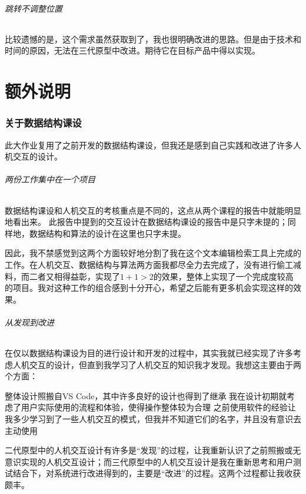 \documentclass[scheme = chinese]{ctexart}
\begin{document}
\paragraph{跳转不调整位置}
比较遗憾的是，这个需求虽然获取到了，我也很明确改进的思路。但是由于技术和时间的原因，无法在三代原型中改进。期待它在目标产品中得以实现。

\clearpage

\part{额外说明}

\section{关于数据结构课设}
此大作业复用了之前开发的数据结构课设，但我还是感到自己实践和改进了许多人机交互的设计。

\paragraph{两份工作集中在一个项目}
数据结构课设和人机交互的考核重点是不同的，这点从两个课程的报告中就能明显地看出来。
此报告中提到的交互设计在数据结构课设的报告中是只字未提的；同样地，数据结构和算法的设计在这里也只字未提。

因此，我不禁感觉到这两个方面较好地分割了我在这个文本编辑检索工具上完成的工作。在人机交互、数据结构与算法两方面我都尽全力去完成了，没有进行偷工减料，而二者又相得益彰，实现了$1+1>2$的效果，整体上实现了一个完成度较高的项目。我对这种工作的组合感到十分开心，希望之后能有更多机会实现这样的效果。

\paragraph{从发现到改进}
在仅以数据结构课设为目的进行设计和开发的过程中，其实我就已经实现了许多考虑人机交互的设计，但直到我学习了人机交互的知识我才发现。我想这主要由于两个方面：

\begin{outline}
    \1 整体设计照搬自VS Code，其中许多良好的设计也得到了继承
    \1 我在设计初期就考虑了用户实际使用的流程和体验，使得操作整体较为合理
    \1 之前使用软件的经验让我多少学习到了一些人机交互的模式，但我并不知道它们的名字，并且没有意识去主动使用
\end{outline}

二代原型中的人机交互设计有许多是“发现”的过程，让我重新认识了之前照搬或无意识实现的人机交互设计；而三代原型中的人机交互设计是我在重新思考和用户测试结合下，对系统进行改进得到的，主要是“改进”的过程。这两个过程都让我收获颇丰。
\end{document}
